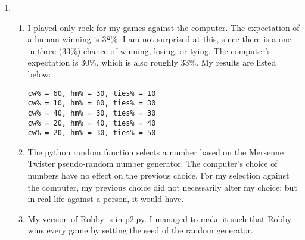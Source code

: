\documentclass{article}
\begin{document}
\begin{enumerate}
\begin{enumerate}
            the path by starting with our drone in room I. This also guarantees that we don't have to make a roundtrip between \textbf{C} \& \textbf{L}. We will have to consider that our drone is going to have to revisit some rooms to gain access to other parts of the floor. Starting from \textbf{I}, here is the cheapest path and its cost:
            \\\\\textit{\textbf{Path: \{I, C, L, D, F, E, F, D, K, G, J, B, A, B, H\}}}
            \\\textit{\textbf{Cost Breakdown:}} 48 (scanning) + 7 (trip from C to L) + 26 (all other trips) = 81 minutes.
            \\\\ To annotate this graph, I would add edges with numbers between each room indicating the cost of traveling from one room to another. Additionally, I would make it clear in a key off to the side that scanning each room takes 2 minutes.
            \item
            At least two batteries are needed for the drone to scan the entire floor if the drone starts in room \textbf{I}.
            \item
            My python file is "p1.py". My DFS function returned the following path for a DFS search. It is quite similar to the one mentioned in part (c) above, but the python program visited \textbf{H} first instead of \textbf{J}.:
            \begin{lstlisting}
['U', 'C', 'I', 'L', 'D', 'F', 'E', 'K', 'G', 'H', 'B', 'A', 'J']
            \end{lstlisting}
        \end{enumerate}
    \item %
    \begin{enumerate}
        \item I played only rock for my games against the computer.
        The expectation of a human winning is 38\%. I am not surprised at this,
        since there is a one in three (33\%) chance of winning, losing, or tying.
        The computer's expectation is 30\%, which is also roughly 33\%. My results are listed below:
        \begin{lstlisting}
cw% = 60, hm% = 30, ties% = 10
cw% = 10, hm% = 60, ties% = 30
cw% = 40, hm% = 30, ties% = 30
cw% = 20, hm% = 40, ties% = 40
cw% = 20, hm% = 30, ties% = 50
        \end{lstlisting}
        \item
        The python random function selects a number based on the Mersenne Twister pseudo-random number generator.
        The computer's choice of numbers have no effect on the previous choice. For my selection against the computer,
        my previous choice did not necessarily alter my choice; but in real-life against a person, it would have.
        \item
        My version of Robby is in p2.py. I managed to make it such that Robby wins every game by setting the seed of the random generator.

    \end{enumerate}

\end{enumerate}
\end{document}
